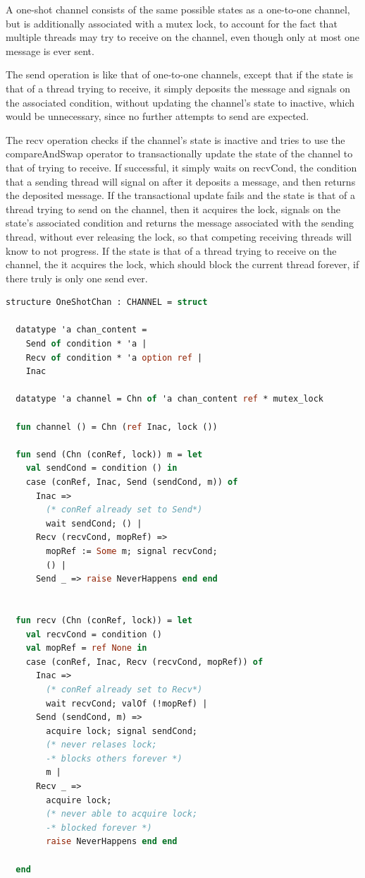 \documentclass{article}
\begin{document}
A one-shot channel consists of the same possible states as a one-to-one channel, but is
additionally associated with a mutex lock, to account for the fact that multiple threads may
try to receive on the channel, even though only at most one message is ever sent.

The send operation is like that of one-to-one channels, except that if the state is that of a
thread trying to receive, it simply deposits the message and signals on the associated
condition, without updating the channel's state to inactive, which would be unnecessary, since
no further attempts to send are expected.

The recv operation checks if the channel's state is inactive and tries to use the
compareAndSwap operator to transactionally update the state of the channel to that of trying
to receive.  If successful, it simply waits on recvCond, the condition that a sending thread
will signal on after it deposits a message, and then returns the deposited message.  If the
transactional update fails and the state is that of a thread trying to send on the channel,
then it acquires the lock, signals on the state's associated condition and returns the message
associated with the sending thread, without ever releasing the lock, so that competing
receiving threads will know to not progress.  If the state is that of a thread trying to
receive on the channel, the it acquires the lock, which should block the current thread
forever, if there truly is only one send ever.


\begin{lstlisting}[language=ML, escapechar=\%]
  structure OneShotChan : CHANNEL = struct

  datatype 'a chan_content =
    Send of condition * 'a |
    Recv of condition * 'a option ref |
    Inac  

  datatype 'a channel = Chn of 'a chan_content ref * mutex_lock

  fun channel () = Chn (ref Inac, lock ())

  fun send (Chn (conRef, lock)) m = let
    val sendCond = condition () in
    case (conRef, Inac, Send (sendCond, m)) of
      Inac =>
        (* conRef already set to Send*)
        wait sendCond; () |
      Recv (recvCond, mopRef) =>
        mopRef := Some m; signal recvCond;
        () |
      Send _ => raise NeverHappens end end


  fun recv (Chn (conRef, lock)) = let
    val recvCond = condition ()
    val mopRef = ref None in
    case (conRef, Inac, Recv (recvCond, mopRef)) of
      Inac =>
        (* conRef already set to Recv*)
        wait recvCond; valOf (!mopRef) |
      Send (sendCond, m) =>
        acquire lock; signal sendCond;
        (* never relases lock;
        -* blocks others forever *)
        m |
      Recv _ =>
        acquire lock;
        (* never able to acquire lock;
        -* blocked forever *)
        raise NeverHappens end end

  end
  \end{lstlisting}
\end{document}
